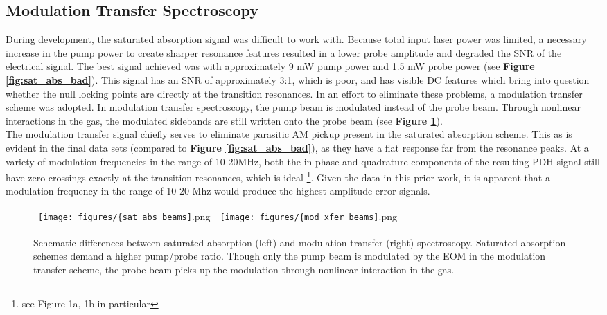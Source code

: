 
\subsection{Modulation Transfer Spectroscopy}

During development, the saturated absorption signal was difficult to work with. Because total input laser power was limited, a necessary increase in the pump power to create sharper resonance features resulted in a lower probe amplitude and degraded the SNR of the electrical signal. The best signal achieved was with approximately 9 mW pump power and 1.5 mW probe power (see \textbf{Figure \ref{fig:sat_abs_bad}}). This signal has an SNR of approximately 3:1, which is poor, and has visible DC features which bring into question whether the null locking points are directly at the transition resonances. In an effort to eliminate these problems, a modulation transfer scheme was adopted. In modulation transfer spectroscopy, the pump beam is modulated instead of the probe beam. Through nonlinear interactions in the gas, the modulated sidebands are still written onto the probe beam (see \textbf{Figure \ref{fig:spectroscopies}}).   \\

The modulation transfer signal chiefly serves to eliminate parasitic AM pickup present in the saturated absorption scheme. This as is evident in the final data sets (compared to \textbf{Figure \ref{fig:sat_abs_bad}}), as they have a flat response far from the resonance peaks. At a variety of modulation frequencies in the range of 10-20MHz, both the in-phase and quadrature components of the resulting PDH signal still have zero crossings exactly at the transition resonances, which is ideal \cite{0957-0233-19-10-105601}\footnote{see Figure 1a, 1b in particular}. Given the data in this prior work, it is apparent that a modulation frequency in the range of 10-20 Mhz would produce the highest amplitude error signals.

\begin{figure}
  \begin{tabular}{ >{\centering\arraybackslash} m{} >{\centering\arraybackslash} m{} }
    \texttt{[image: figures/\{sat\_abs\_beams]}.png} &
    \texttt{[image: figures/\{mod\_xfer\_beams]}.png} \\
  \end{tabular}
  \caption{Schematic differences between saturated absorption (left) and modulation transfer (right) spectroscopy. Saturated absorption schemes demand a higher pump/probe ratio. Though only the pump beam is modulated by the EOM in the modulation transfer scheme, the probe beam picks up the modulation through nonlinear interaction in the gas.}
  \label{fig:spectroscopies}
\end{figure}